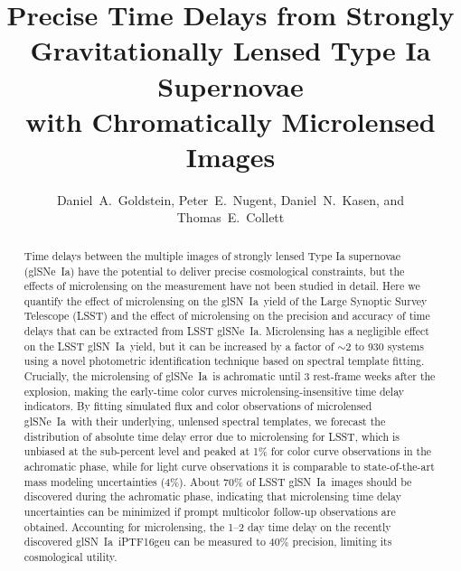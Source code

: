 \documentclass[iop,apj,numberedappendix,twocolappendix]{emulateapj}
\newcommand{\snia}{{\rm SN~Ia}}
\newcommand{\sneia}{{\rm SNe~Ia}}
\begin{document}
\title{Precise Time Delays from Strongly Gravitationally Lensed Type Ia Supernovae\\with Chromatically Microlensed Images}
\author{Daniel~A.~Goldstein, 
		Peter~E.~Nugent,
        Daniel~N.~Kasen,
        and Thomas~E.~Collett
}
        


\begin{abstract}
  Time delays between the multiple images of strongly lensed Type Ia supernovae (gl\sneia) have the potential to deliver precise cosmological constraints, but the effects of microlensing on the measurement have not been studied in detail. Here we quantify the effect of microlensing on the gl\snia\ yield of the Large Synoptic Survey Telescope (LSST) and the effect of microlensing on the precision and accuracy of time delays that can be extracted from LSST gl\sneia. Microlensing has a negligible effect on the LSST gl\snia\ yield, but it can be increased by a factor of $\sim$2 to 930 systems using a novel photometric identification technique based on spectral template fitting. Crucially, the microlensing of gl\sneia\ is achromatic until 3 rest-frame weeks after the explosion, making the early-time color curves microlensing-insensitive time delay indicators. By fitting simulated flux and color observations of microlensed gl\sneia\ with their underlying, unlensed spectral templates, we forecast the distribution of absolute time delay error due to microlensing for LSST, which is unbiased at the sub-percent level and peaked at 1\% for color curve observations in the achromatic phase, while for light curve observations it is comparable to state-of-the-art mass modeling uncertainties (4\%). About 70\% of LSST gl\snia\ images should be discovered during the achromatic phase, indicating that microlensing time delay uncertainties can be minimized if prompt multicolor follow-up observations are obtained. Accounting for microlensing, the 1--2 day time delay on the recently discovered gl\snia\ iPTF16geu can be measured to 40\% precision, limiting its cosmological utility.
\end{abstract}
\end{document}
